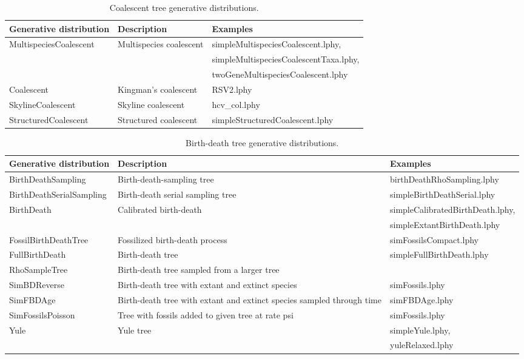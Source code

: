 \documentclass[12pt]{article} %
\begin{document}
\begin{table}
\small
\begin{tabular}{ l | l | l }
    \hline\hline
    Generative distribution & Description & Examples \\ 
    \hline\hline
    MultispeciesCoalescent & Multispecies coalescent & simpleMultispeciesCoalescent.lphy, \\ & & simpleMultispeciesCoalescentTaxa.lphy, \\ & & twoGeneMultispeciesCoalescent.lphy\\  
    Coalescent & Kingman's coalescent \cite{Rodrigo1999SerialCoalescent} & RSV2.lphy \\  
    SkylineCoalescent & Skyline coalescent \cite{drummond2005bayesiansequences} & hcv\_col.lphy\\  
    StructuredCoalescent & Structured coalescent\cite{muller2017structured} & simpleStructuredCoalescent.lphy\\  
    \hline
\end{tabular}

\label{tab:coalescent}
\caption{Coalescent tree generative distributions.}
\end{table}

\begin{table}
\small
\begin{tabular}{ p{4.6cm} | p{6.5cm} | p{5cm} }
    \hline\hline
    Generative distribution & Description & Examples \\ 
    \hline\hline
    BirthDeathSampling & Birth-death-sampling tree\cite{stadler2011mammalian,stadler2012estimatingdata} & birthDeathRhoSampling.lphy\\  
    BirthDeathSerialSampling & Birth-death serial sampling tree\cite{stadler2013dating} & simpleBirthDeathSerial.lphy\\  
    BirthDeath & Calibrated birth-death\cite{heled2015calibrated} & simpleCalibratedBirthDeath.lphy, \\ & & simpleExtantBirthDeath.lphy\\  
    FossilBirthDeathTree & Fossilized birth-death process\cite{heath2014fossilized} & simFossilsCompact.lphy\\  
    FullBirthDeath & Birth-death tree\cite{kendall1948generalized} & simpleFullBirthDeath.lphy\\  
    RhoSampleTree & Birth-death tree sampled from a larger tree & \\  
    SimBDReverse & Birth-death tree with extant and extinct species & simFossils.lphy\\  
    SimFBDAge & Birth-death tree with extant and extinct species sampled through time & simFBDAge.lphy \\   
    SimFossilsPoisson & Tree with fossils added to given tree at rate psi & simFossils.lphy\\  
    Yule & Yule tree\cite{yule1925ii} & simpleYule.lphy, \\ 
    & & yuleRelaxed.lphy\\  
    \hline
\end{tabular}
\label{tab:coalescent}
\caption{Birth-death tree generative distributions.}
\end{table}
\end{document}
